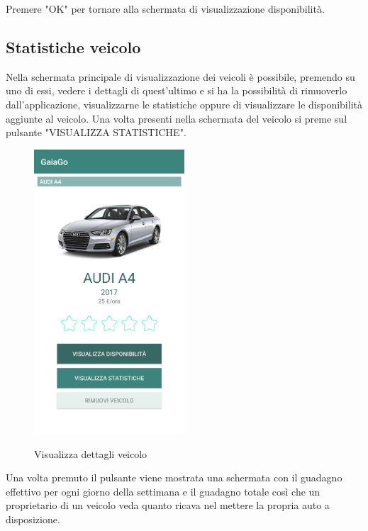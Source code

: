 Premere "OK" per tornare alla schermata di visualizzazione disponibilità. 
\pagebreak

\subsection{Statistiche veicolo}
Nella schermata principale di visualizzazione dei veicoli è possibile, premendo su uno di essi, vedere i dettagli di quest'ultimo e si ha la possibilità di rimuoverlo dall'applicazione, visualizzarne le statistiche oppure di visualizzare le disponibilità aggiunte al veicolo. Una volta presenti nella schermata del veicolo si preme sul pulsante "VISUALIZZA STATISTICHE".
\begin{figure}[H] 
	\centering 
	\includegraphics[width=0.5\textwidth]{res/images/visualizza_dettagli.png}\\
	\caption{Visualizza dettagli veicolo}
	\label{statistiche}
\end{figure}
\pagebreak
Una volta premuto il pulsante viene mostrata una schermata con il guadagno effettivo per ogni giorno della settimana e il guadagno totale così che un proprietario di un veicolo veda quanto ricava nel mettere la propria auto a disposizione.
